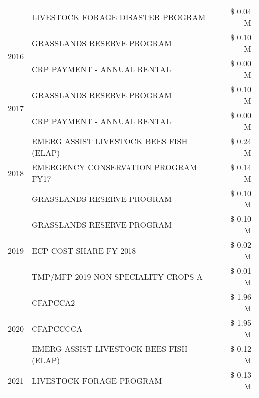 \begin{tabular}{llr}
 & LIVESTOCK FORAGE DISASTER PROGRAM & \$ 0.04 M \\
\cline{1-3}
\multirow[t]{2}{*}{2016} & GRASSLANDS RESERVE PROGRAM & \$ 0.10 M \\
 & CRP PAYMENT - ANNUAL RENTAL & \$ 0.00 M \\
\cline{1-3}
\multirow[t]{2}{*}{2017} & GRASSLANDS RESERVE PROGRAM & \$ 0.10 M \\
 & CRP PAYMENT - ANNUAL RENTAL & \$ 0.00 M \\
\cline{1-3}
\multirow[t]{3}{*}{2018} & EMERG ASSIST LIVESTOCK BEES FISH (ELAP) & \$ 0.24 M \\
 & EMERGENCY CONSERVATION PROGRAM FY17 & \$ 0.14 M \\
 & GRASSLANDS RESERVE PROGRAM & \$ 0.10 M \\
\cline{1-3}
\multirow[t]{3}{*}{2019} & GRASSLANDS RESERVE PROGRAM & \$ 0.10 M \\
 & ECP COST SHARE FY 2018 & \$ 0.02 M \\
 & TMP/MFP 2019 NON-SPECIALITY CROPS-A & \$ 0.01 M \\
\cline{1-3}
\multirow[t]{3}{*}{2020} & CFAPCCA2 & \$ 1.96 M \\
 & CFAPCCCCA & \$ 1.95 M \\
 & EMERG ASSIST LIVESTOCK BEES FISH (ELAP) & \$ 0.12 M \\
\cline{1-3}
2021 & LIVESTOCK FORAGE PROGRAM & \$ 0.13 M \\
\cline{1-3}
\bottomrule
\end{tabular}
